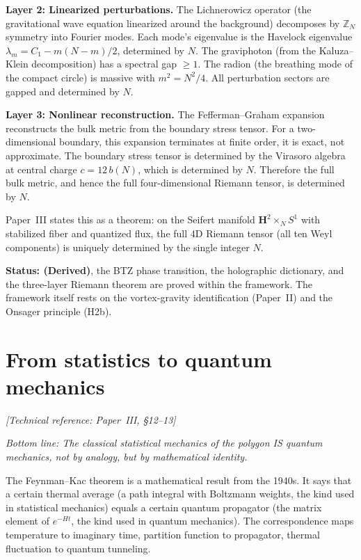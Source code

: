 \textbf{Layer 2: Linearized perturbations.} The Lichnerowicz operator
(the gravitational wave equation linearized around the background)
decomposes by $\mathbb{Z}_N$ symmetry into Fourier modes. Each mode's
eigenvalue is the Havelock eigenvalue $\lambda_m = C_1 - m(N-m)/2$,
determined by $N$. The graviphoton (from the Kaluza--Klein decomposition)
has a spectral gap $\ge 1$. The radion (the breathing mode of the
compact circle) is massive with $m^2 = N^2/4$. All perturbation sectors
are gapped and determined by $N$.

\textbf{Layer 3: Nonlinear reconstruction.} The Fefferman--Graham
expansion reconstructs the bulk metric from the boundary stress tensor.
For a two-dimensional boundary, this expansion terminates at finite
order, it is exact, not approximate. The boundary stress tensor is
determined by the Virasoro algebra at central charge $c = 12\,b(N)$,
which is determined by $N$. Therefore the full bulk metric, and hence the
full four-dimensional Riemann tensor, is determined by $N$.

Paper~III states this as a theorem: on the Seifert manifold
$\mathbf{H}^2 \times_N S^1$ with stabilized fiber and quantized flux,
the full $4$D Riemann tensor (all ten Weyl components) is uniquely
determined by the single integer $N$.

\textbf{Status: (Derived)}, the BTZ phase transition, the holographic
dictionary, and the three-layer Riemann theorem are proved within the
framework. The framework itself rests on the vortex-gravity
identification (Paper~II) and the Onsager principle (H2b).


\section{From statistics to quantum mechanics}
\noindent\textit{[Technical reference: Paper~III, \S12--13]}

\medskip

\noindent\textit{Bottom line: The classical statistical mechanics of
the polygon IS quantum mechanics, not by analogy, but by mathematical
identity.}

\medskip

The Feynman--Kac theorem is a mathematical result from the 1940s. It says
that a certain thermal average (a path integral with Boltzmann weights,
the kind used in statistical mechanics) equals a certain quantum
propagator (the matrix element of $e^{-Ht}$, the kind used in quantum
mechanics). The correspondence maps temperature to imaginary time,
partition function to propagator, thermal fluctuation to quantum
tunneling.

